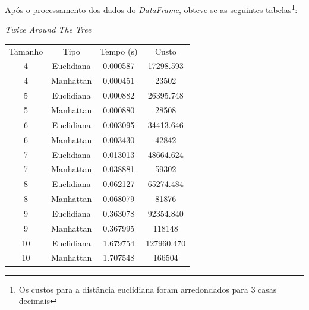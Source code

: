 \documentclass{article}
\begin{document}
Após o processamento dos dados do \textit{DataFrame}, obteve-se as seguintes tabelas\footnote{Os custos para a distância euclidiana foram arredondados para 3 casas decimais}:

\begin{center}
	\textit{Twice Around The Tree} \\ [1ex]
	\begin{tabular}{c c c c }
		\hline
		Tamanho & Tipo       & Tempo (s) & Custo      \\ [0.5ex]
		4       & Euclidiana & 0.000587  & 17298.593  \\
		4       & Manhattan  & 0.000451  & 23502      \\
		5       & Euclidiana & 0.000882  & 26395.748  \\
		5       & Manhattan  & 0.000880  & 28508      \\
		6       & Euclidiana & 0.003095  & 34413.646  \\
		6       & Manhattan  & 0.003430  & 42842      \\
		7       & Euclidiana & 0.013013  & 48664.624  \\
		7       & Manhattan  & 0.038881  & 59302      \\
		8       & Euclidiana & 0.062127  & 65274.484  \\
		8       & Manhattan  & 0.068079  & 81876      \\
		9       & Euclidiana & 0.363078  & 92354.840  \\
		9       & Manhattan  & 0.367995  & 118148     \\
		10      & Euclidiana & 1.679754  & 127960.470 \\
		10      & Manhattan  & 1.707548  & 166504     \\ [1ex]
		\hline
	\end{tabular}
\end{center}
\end{document}
